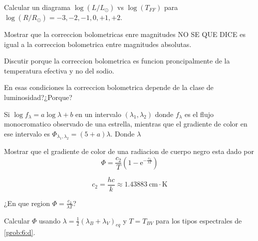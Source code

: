 \documentclass[12pt,a4paper]{practice}
\begin{document}
    \begin{problem}\label{prob:9}
        Calcular un diagrama $\log (L/L_{\odot})$ vs $\log (T_{FF})$ para $\log \left(R/R_{\odot}\right) = -3, -2, -1, 0, +1, +2$.

            \begin{problempart}\label{prob:9:a}
                Mostrar que la correccion bolometricas enre magnitudes NO SE QUE DICE  es igual a la correccion bolometrica entre magnitudes absolutas.
            \end{problempart}
    \end{problem}

    \begin{problem}\label{prob:10}
        Discutir porque la correccion bolometrica es funcion proncipalmente de la temperatura efectiva y no del sodio.

        En esas condiciones la correccion bolometrica depende de la clase de luminosidad?¿Porque?
    \end{problem}

    \begin{problem}\label{prob:11}
        Si $\log f_{\lambda} = a\log\lambda + b$ en un intervalo $(\lambda_{1}, \lambda_{2})$ donde $f_{\lambda}$ es el flujo monocromatico observado de una estrella, mientras que el gradiente de color en ese intervalo es $\Phi _{\lambda_{1},\lambda_{2}} = \left(5+a\right)\lambda$. Donde $\lambda$
    \end{problem}

    \begin{problem}\label{prob:12}
        \begin{problempart}\label{prob:12:a}
            Mostrar que el gradiente de color de una radiacion de cuerpo negro esta dado por
            $$
                \Phi = \frac{c_2}{T}\left(1 - \mathrm{e}^{-\frac{c_2}{\lambda T}}\right)
            $$

            $$
                c_2 = \frac{hc}{k} \approx 1.43883\ \mathrm{cm \cdot K}
            $$
        \end{problempart}

        \begin{problempart}\label{prob:12:b}
            ¿En que region $\Phi = \frac{c_2}{\lambda T}$?
        \end{problempart}

        \begin{problempart}\label{prob:12:c}
            Calcular $\Phi$ usando $\lambda = \frac{1}{2}\left(\lambda_B + \lambda_V\right)_{eq}$ y $T = T_{BV}$ para los tipos espectrales de \ref{prob:6:d}.
        \end{problempart}
    \end{problem}
\end{document}
